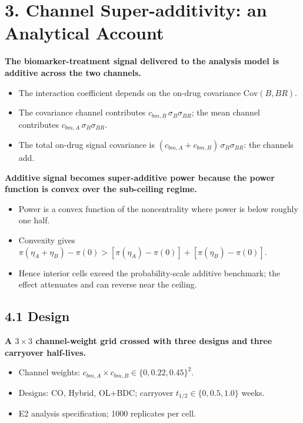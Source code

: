 \documentclass[
  11pt,
]{article}
\begin{document}
\section{3. Channel Super-additivity: an Analytical Account}

\textbf{The biomarker-treatment signal delivered to the analysis
model is additive across the two channels.}

\begin{itemize}\setlength{\itemsep}{2pt}\setlength{\parskip}{0pt}
\item The interaction coefficient depends on the on-drug covariance
  $\mathrm{Cov}(B, BR)$.
\item The covariance channel contributes
  $c_{bm,B}\,\sigma_B \sigma_{BR}$; the mean channel contributes
  $c_{bm,A}\,\sigma_B \sigma_{BR}$.
\item The total on-drug signal covariance is
  $(c_{bm,A} + c_{bm,B})\,\sigma_B \sigma_{BR}$: the channels add.
\end{itemize}

\textbf{Additive signal becomes super-additive power because the
power function is convex over the sub-ceiling regime.}

\begin{itemize}\setlength{\itemsep}{2pt}\setlength{\parskip}{0pt}
\item Power is a convex function of the noncentrality where power is
  below roughly one half.
\item Convexity gives
  $\pi(\eta_A + \eta_B) - \pi(0) >
   [\pi(\eta_A) - \pi(0)] + [\pi(\eta_B) - \pi(0)]$.
\item Hence interior cells exceed the probability-scale additive
  benchmark; the effect attenuates and can reverse near the ceiling.
\end{itemize}

\subsection{4.1 Design}

\textbf{A $3 \times 3$ channel-weight grid crossed with three
designs and three carryover half-lives.}

\begin{itemize}\setlength{\itemsep}{2pt}\setlength{\parskip}{0pt}
\item Channel weights: $c_{bm,A} \times c_{bm,B} \in
  \{0, 0.22, 0.45\}^2$.
\item Designs: CO, Hybrid, OL+BDC; carryover
  $t_{1/2} \in \{0, 0.5, 1.0\}$ weeks.
\item E2 analysis specification; 1000 replicates per cell.
\end{itemize}
\end{document}
